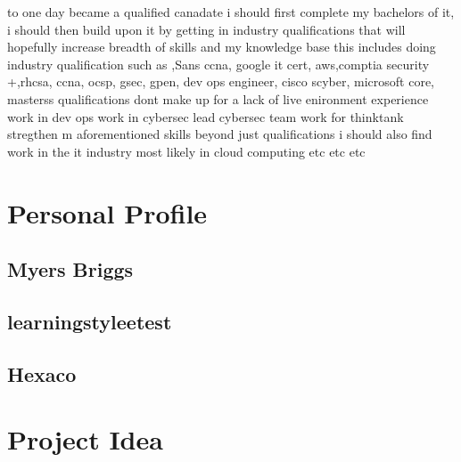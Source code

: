 \documentclass{article}
\begin{document}
to one  day became a qualified canadate i should first complete my bachelors of it, i should then build upon it by getting in industry qualifications that will hopefully increase breadth of skills and my knowledge base this includes doing industry qualification such as ,Sans ccna, google it cert, aws,comptia security +,rhcsa, ccna, ocsp, gsec, gpen, dev ops engineer, cisco scyber, microsoft core, masterss
qualifications dont make up for a lack of live enironment experience
work in dev ops work in cybersec lead cybersec team work for thinktank  stregthen m aforementioned skills
beyond just qualifications i should also find work in the it industry most likely in cloud computing  etc etc etc 


\section{Personal Profile}
\subsection{Myers Briggs}
\subsection{learningstyleetest}
\subsection{Hexaco}



\section{Project Idea}
\end{document}
